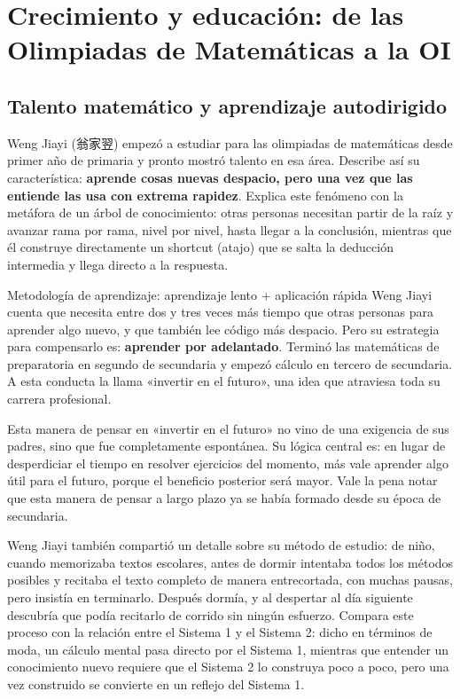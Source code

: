 \section{Crecimiento y educación: de las Olimpiadas de Matemáticas a la OI}

\subsection{Talento matemático y aprendizaje autodirigido}

Weng Jiayi (翁家翌) empezó a estudiar para las olimpiadas de matemáticas desde primer año de primaria y pronto mostró talento en esa área. Describe así su característica: \textbf{aprende cosas nuevas despacio, pero una vez que las entiende las usa con extrema rapidez}. Explica este fenómeno con la metáfora de un árbol de conocimiento: otras personas necesitan partir de la raíz y avanzar rama por rama, nivel por nivel, hasta llegar a la conclusión, mientras que él construye directamente un shortcut (atajo) que se salta la deducción intermedia y llega directo a la respuesta.

\begin{importantbox}{Metodología de aprendizaje: aprendizaje lento + aplicación rápida}
Weng Jiayi cuenta que necesita entre dos y tres veces más tiempo que otras personas para aprender algo nuevo, y que también lee código más despacio. Pero su estrategia para compensarlo es: \textbf{aprender por adelantado}. Terminó las matemáticas de preparatoria en segundo de secundaria y empezó cálculo en tercero de secundaria. A esta conducta la llama «invertir en el futuro», una idea que atraviesa toda su carrera profesional.
\end{importantbox}

Esta manera de pensar en «invertir en el futuro» no vino de una exigencia de sus padres, sino que fue completamente espontánea. Su lógica central es: en lugar de desperdiciar el tiempo en resolver ejercicios del momento, más vale aprender algo útil para el futuro, porque el beneficio posterior será mayor. Vale la pena notar que esta manera de pensar a largo plazo ya se había formado desde su época de secundaria.

Weng Jiayi también compartió un detalle sobre su método de estudio: de niño, cuando memorizaba textos escolares, antes de dormir intentaba todos los métodos posibles y recitaba el texto completo de manera entrecortada, con muchas pausas, pero insistía en terminarlo. Después dormía, y al despertar al día siguiente descubría que podía recitarlo de corrido sin ningún esfuerzo. Compara este proceso con la relación entre el Sistema 1 y el Sistema 2: dicho en términos de moda, un cálculo mental pasa directo por el Sistema 1, mientras que entender un conocimiento nuevo requiere que el Sistema 2 lo construya poco a poco, pero una vez construido se convierte en un reflejo del Sistema 1.


